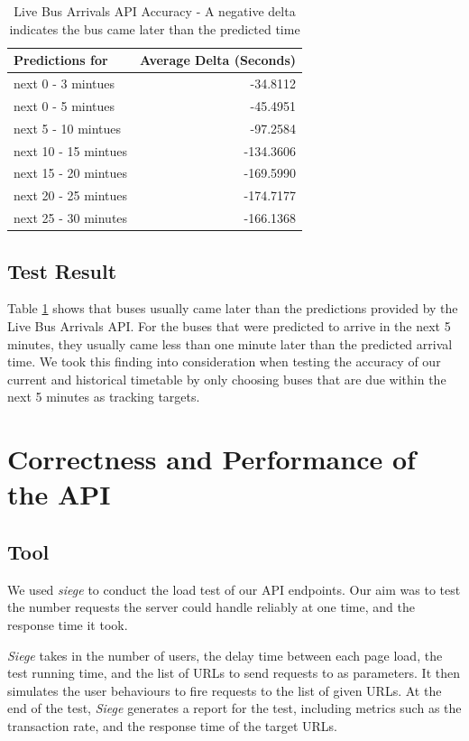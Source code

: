 \begin{table}
\centering
\begin{tabular}{@{}lr@{}} \toprule
Predictions for & Average Delta (Seconds) \\ \midrule
next 0 - 3 mintues & -34.8112 \\
next 0 - 5 mintues & -45.4951 \\
next 5 - 10 mintues & -97.2584 \\
next 10 - 15 mintues & -134.3606 \\
next 15 - 20 mintues & -169.5990 \\
next 20 - 25 mintues & -174.7177 \\
next 25 - 30 minutes & -166.1368 \\
\bottomrule
\end{tabular}
\caption{Live Bus Arrivals API Accuracy - A negative delta indicates the bus came later than the predicted time}
\label{table:countdown_evaluation}
\end{table}

\subsection{Test Result}
\par Table \ref{table:countdown_evaluation} shows that buses usually came later than the predictions provided by the Live Bus Arrivals API. For the buses that were predicted to arrive in the next 5 minutes, they usually came less than one minute later than the predicted arrival time. We took this finding into consideration when testing the accuracy of our current and historical timetable by only choosing buses that are due within the next 5 minutes as tracking targets.

\section{Correctness and Performance of the API}
\subsection{Tool}
\par We used \textit{siege}\cite{siege} to conduct the load test of our API endpoints. Our aim was to test the number requests the server could handle reliably at one time, and the response time it took.

\par \textit{Siege} takes in the number of users, the delay time between each page load, the test running time, and the list of URLs to send requests to as parameters. It then simulates the user behaviours to fire requests to the list of given URLs. At the end of the test, \textit{Siege} generates a report for the test, including metrics such as the transaction rate, and the response time of the target URLs.

